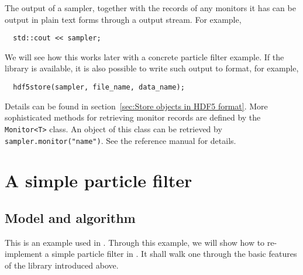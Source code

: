 The output of a sampler, together with the records of any monitors it has can
be output in plain text forms through a \cpp output stream. For example,
\begin{Verbatim}
  std::cout << sampler;
\end{Verbatim}
We will see how this works later with a concrete particle filter example. If
the \hdf library is available, it is also possible to write such output to \hdf
format, for example,
\begin{Verbatim}
  hdf5store(sampler, file_name, data_name);
\end{Verbatim}
Details can be found in section~\ref{sec:Store objects in HDF5 format}. More
sophisticated methods for retrieving monitor records are defined by the
\verb|Monitor<T>| class. An object of this class can be retrieved by
\verb|sampler.monitor("name")|. See the reference manual for details.

\section{A simple particle filter}
\label{sec:A simple particle filter}

\subsection{Model and algorithm}
\label{sub:Model and algorithm}

This is an example used in \textcite{Johansen:2009wd}. Through this example, we
will show how to re-implement a simple particle filter in \vsmc. It shall walk
one through the basic features of the library introduced above.

